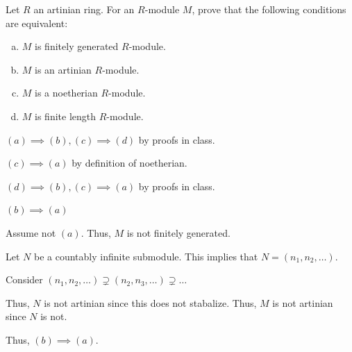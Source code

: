 \documentclass[12pt, letterpaper]{article}
\begin{document}
\begin{problem}{}
    Let $R$ an artinian ring. For an $R$-module $M$, prove that the following conditions are equivalent:
    \begin{enumerate}[(a)]
        \item $M$ is finitely generated $R$-module.
        \item $M$ is an artinian $R$-module.
        \item $M$ is a noetherian $R$-module.
        \item $M$ is finite length $R$-module.
    \end{enumerate}
\end{problem}
\begin{problemproof}
    $(a) \implies (b),(c) \implies (d)$ by proofs in class.

    $(c) \implies (a)$ by definition of noetherian.

    $(d) \implies (b),(c) \implies (a)$ by proofs in class.

    $(b) \implies (a)$

    Assume not $(a)$. Thus, $M$ is not finitely generated.

    Let $N$ be a countably infinite submodule. This implies that $N=(n_1,n_2,\dots)$.

    Consider $(n_1,n_2,\dots) \supsetneq (n_2,n_3,\dots) \supsetneq \dots$

    Thus, $N$ is not artinian since this does not stabalize. Thus, $M$ is not artinian since $N$ is not.

    Thus, $(b) \implies (a)$.
\end{problemproof}
\end{document}
